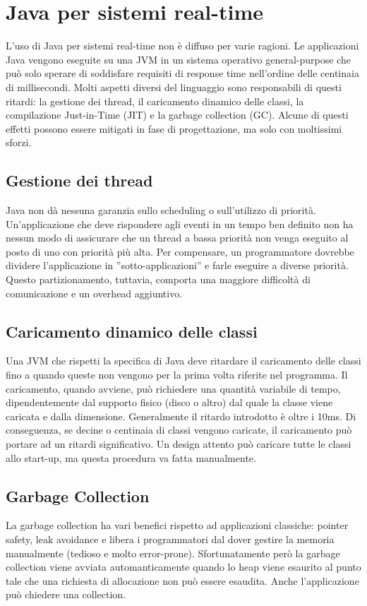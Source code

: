 \section{Java per sistemi real-time}
L'uso di Java per sistemi real-time non è diffuso per varie ragioni. Le applicazioni Java vengono eseguite su una JVM in un sistema operativo general-purpose che può solo sperare di soddisfare requisiti di response time nell'ordine delle centinaia di millisecondi. Molti aspetti diversi del linguaggio sono responsabili di questi ritardi: la gestione dei thread, il caricamento dinamico delle classi, la compilazione Just-in-Time (JIT) e la garbage collection (GC). Alcune di questi effetti possono essere mitigati in fase di progettazione, ma solo con moltissimi sforzi. 

\subsection{Gestione dei thread}
Java non dà nessuna garanzia sullo scheduling o sull'utilizzo di priorità. Un'applicazione che deve rispondere agli eventi in un tempo ben definito non ha nessun modo di assicurare che un thread a bassa priorità non venga eseguito al posto di uno con priorità più alta. Per compensare, un programmatore dovrebbe dividere l'applicazione in ''sotto-applicazioni'' e farle eseguire a diverse priorità. Questo partizionamento, tuttavia, comporta una maggiore difficoltà di comunicazione e un overhead aggiuntivo.

\subsection{Caricamento dinamico delle classi}
Una JVM che rispetti la specifica di Java deve ritardare il caricamento delle classi fino a quando queste non vengono per la prima volta riferite nel programma. Il caricamento, quando avviene, può richiedere una quantità variabile di tempo, dipendentemente dal supporto fisico (disco o altro) dal quale la classe viene caricata e dalla dimensione. Generalmente il ritardo introdotto è oltre i 10ms. Di conseguenza, se decine o centinaia di classi vengono caricate, il caricamento può portare ad un ritardi significativo. Un design attento può caricare tutte le classi allo start-up, ma questa procedura va fatta manualmente.

\subsection{Garbage Collection}
La garbage collection ha vari benefici rispetto ad applicazioni classiche: pointer safety, leak avoidance e libera i programmatori dal dover gestire la memoria manualmente (tedioso e molto error-prone). Sfortunatamente però la garbage collection viene avviata automanticamente quando lo heap viene esaurito al punto tale che una richiesta di allocazione non può essere esaudita. Anche l'applicazione può chiedere una collection.

